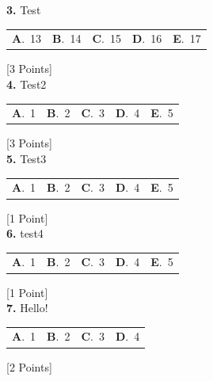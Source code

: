 \documentclass[12pt]{article}
\newcommand{\choice}[2]{\textbf{#1}.~#2}
\begin{document}
\noindent \textbf{\textenglish{3.}} {\textenglish{Test}}

\begin{tabularx}{\linewidth}{@{}*{5}{Y}@{}}
\choice{A}{{{\textenglish{13}}}} & \choice{B}{{{\textenglish{14}}}} & \choice{C}{{{\textenglish{15}}}} & \choice{D}{{{\textenglish{16}}}} & \choice{E}{{{\textenglish{17}}}} \\
\end{tabularx}
\hfill {\textenglish{[3 Points]}}\\[0.5em]

\noindent \textbf{\textenglish{4.}} {\textenglish{Test2}}

\begin{tabularx}{\linewidth}{@{}*{5}{Y}@{}}
\choice{A}{{{\textenglish{1}}}} & \choice{B}{{{\textenglish{2}}}} & \choice{C}{{{\textenglish{3}}}} & \choice{D}{{{\textenglish{4}}}} & \choice{E}{{{\textenglish{5}}}} \\
\end{tabularx}
\hfill {\textenglish{[3 Points]}}\\[0.5em]

\noindent \textbf{\textenglish{5.}} {\textenglish{Test3}}

\begin{tabularx}{\linewidth}{@{}*{5}{Y}@{}}
\choice{A}{{{\textenglish{1}}}} & \choice{B}{{{\textenglish{2}}}} & \choice{C}{{{\textenglish{3}}}} & \choice{D}{{{\textenglish{4}}}} & \choice{E}{{{\textenglish{5}}}} \\
\end{tabularx}
\hfill {\textenglish{[1 Point]}}\\[0.5em]

\noindent \textbf{\textenglish{6.}} {\textenglish{test4}}

\begin{tabularx}{\linewidth}{@{}*{5}{Y}@{}}
\choice{A}{{{\textenglish{1}}}} & \choice{B}{{{\textenglish{2}}}} & \choice{C}{{{\textenglish{3}}}} & \choice{D}{{{\textenglish{4}}}} & \choice{E}{{{\textenglish{5}}}} \\
\end{tabularx}
\hfill {\textenglish{[1 Point]}}\\[0.5em]

\noindent \textbf{\textenglish{7.}} {\textenglish{Hello!}}

\begin{tabularx}{\linewidth}{@{}*{4}{Y}@{}}
\choice{A}{{{\textenglish{1}}}} & \choice{B}{{{\textenglish{2}}}} & \choice{C}{{{\textenglish{3}}}} & \choice{D}{{{\textenglish{4}}}} \\
\end{tabularx}
\hfill {\textenglish{[2 Points]}}\\[0.5em]
\end{document}
